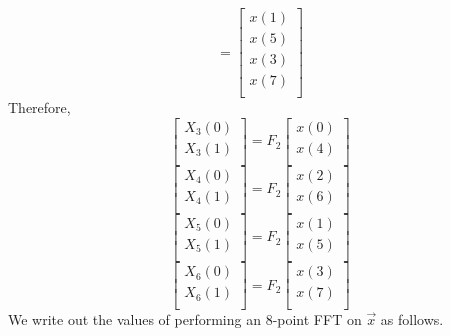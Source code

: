 \documentclass[journal,12pt,twocolumn]{IEEEtran}
\renewcommand\thesection{\arabic{section}}
\begin{document}
\begin{enumerate}[label=\arabic*.,ref=\thesection.\theenumi]
\begin{equation}
 = 
\begin{bmatrix}
x(1) \\ 
x(5) \\ 
x(3) \\ 
x(7) \\
\end{bmatrix}
\end{equation}
Therefore,
\begin{equation}
\begin{bmatrix}
X_{3}(0) \\ 
X_{3}(1)\\ 
\end{bmatrix}
= F_{2}
\begin{bmatrix}
x(0) \\ 
x(4) \\ 
\end{bmatrix}
\end{equation}
\begin{equation}
\begin{bmatrix}
X_{4}(0) \\ 
X_{4}(1)\\ 
\end{bmatrix}
= F_{2}
\begin{bmatrix}
x(2) \\ 
x(6) \\ 
\end{bmatrix}
\end{equation}
\begin{equation}
\begin{bmatrix}
X_{5}(0) \\ 
X_{5}(1)\\ 
\end{bmatrix}
= F_{2}
\begin{bmatrix}
x(1) \\ 
x(5) \\ 
\end{bmatrix}
\end{equation}
\begin{equation}
\begin{bmatrix}
X_{6}(0) \\ 
X_{6}(1)\\ 
\end{bmatrix}
= F_{2}
\begin{bmatrix}
x(3) \\ 
x(7) \\ 
\end{bmatrix}
\end{equation}
\solution We write out the values of performing an 8-point FFT on $\vec{x}$ as follows.

\end{enumerate}
\end{document}
